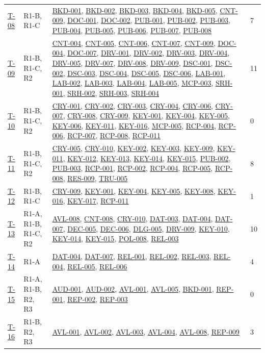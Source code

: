 \documentclass[11pt,a4paper]{article}
\newcommand{\rr}[1]{\hyperlink{req:#1}{#1}}
\begin{document}
\begin{longtable}{@{}P{0.07\textwidth}P{0.10\textwidth}P{0.64\textwidth}P{0.08\textwidth}@{}}
\hyperlink{test:T-08}{T-08} & R1-B, R1-C & \rr{BKD-001}, \rr{BKD-002}, \rr{BKD-003}, \rr{BKD-004}, \rr{BKD-005}, \rr{CNT-009}, \rr{DOC-001}, \rr{DOC-002}, \rr{PUB-001}, \rr{PUB-002}, \rr{PUB-003}, \rr{PUB-004}, \rr{PUB-005}, \rr{PUB-006}, \rr{PUB-007}, \rr{PUB-008} & 7\\
\hyperlink{test:T-09}{T-09} & R1-B, R1-C, R2 & \rr{CNT-004}, \rr{CNT-005}, \rr{CNT-006}, \rr{CNT-007}, \rr{CNT-009}, \rr{DOC-004}, \rr{DOC-007}, \rr{DRV-001}, \rr{DRV-002}, \rr{DRV-003}, \rr{DRV-004}, \rr{DRV-005}, \rr{DRV-007}, \rr{DRV-008}, \rr{DRV-009}, \rr{DSC-001}, \rr{DSC-002}, \rr{DSC-003}, \rr{DSC-004}, \rr{DSC-005}, \rr{DSC-006}, \rr{LAB-001}, \rr{LAB-002}, \rr{LAB-003}, \rr{LAB-004}, \rr{LAB-005}, \rr{MCP-003}, \rr{SRH-001}, \rr{SRH-002}, \rr{SRH-003}, \rr{SRH-004} & 11\\
\hyperlink{test:T-10}{T-10} & R1-B, R1-C, R2 & \rr{CRY-001}, \rr{CRY-002}, \rr{CRY-003}, \rr{CRY-004}, \rr{CRY-006}, \rr{CRY-007}, \rr{CRY-008}, \rr{CRY-009}, \rr{KEY-001}, \rr{KEY-004}, \rr{KEY-005}, \rr{KEY-006}, \rr{KEY-011}, \rr{KEY-016}, \rr{MCP-005}, \rr{RCP-004}, \rr{RCP-006}, \rr{RCP-007}, \rr{RCP-008}, \rr{RCP-011} & 0\\
\hyperlink{test:T-11}{T-11} & R1-B, R1-C, R2 & \rr{CRY-005}, \rr{CRY-010}, \rr{KEY-002}, \rr{KEY-003}, \rr{KEY-009}, \rr{KEY-011}, \rr{KEY-012}, \rr{KEY-013}, \rr{KEY-014}, \rr{KEY-015}, \rr{PUB-002}, \rr{PUB-003}, \rr{RCP-001}, \rr{RCP-002}, \rr{RCP-004}, \rr{RCP-005}, \rr{RCP-008}, \rr{RES-009}, \rr{TRU-005} & 8\\
\hyperlink{test:T-12}{T-12} & R1-B, R1-C & \rr{CRY-009}, \rr{KEY-001}, \rr{KEY-004}, \rr{KEY-005}, \rr{KEY-008}, \rr{KEY-016}, \rr{KEY-017}, \rr{RCP-011} & 1\\
\hyperlink{test:T-13}{T-13} & R1-A, R1-B, R1-C, R2 & \rr{AVL-008}, \rr{CNT-008}, \rr{CRY-010}, \rr{DAT-003}, \rr{DAT-004}, \rr{DAT-007}, \rr{DEC-005}, \rr{DEC-006}, \rr{DLG-005}, \rr{DRV-009}, \rr{KEY-010}, \rr{KEY-014}, \rr{KEY-015}, \rr{POL-008}, \rr{REL-003} & 10\\
\hyperlink{test:T-14}{T-14} & R1-A & \rr{DAT-004}, \rr{DAT-007}, \rr{REL-001}, \rr{REL-002}, \rr{REL-003}, \rr{REL-004}, \rr{REL-005}, \rr{REL-006} & 4\\
\hyperlink{test:T-15}{T-15} & R1-A, R1-B, R2, R3 & \rr{AUD-001}, \rr{AUD-002}, \rr{AVL-001}, \rr{AVL-005}, \rr{BKD-001}, \rr{REP-001}, \rr{REP-002}, \rr{REP-003} & 0\\
\hyperlink{test:T-16}{T-16} & R1-B, R2, R3 & \rr{AVL-001}, \rr{AVL-002}, \rr{AVL-003}, \rr{AVL-004}, \rr{AVL-008}, \rr{REP-009} & 3\\

\end{longtable}
\end{document}

